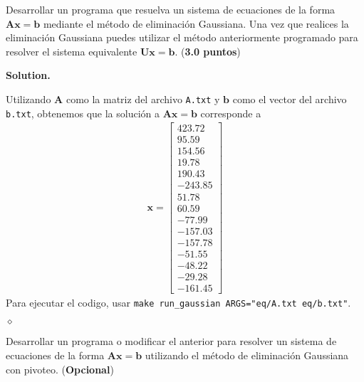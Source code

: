 \documentclass{article}
\theoremstyle{problemstyle}
\newenvironment{solution}{%
  \begin{mdframed}[linewidth=0.8pt,linecolor=Gray,backgroundcolor=Gray!5,roundcorner=5pt]%
  \noindent\textbf{Solution.}%
}{%
\hfill $ \diamond $ 
  \end{mdframed}%
}
\begin{document}
\begin{problem}
Desarrollar un programa que resuelva un sistema de ecuaciones de la forma $ \mathbf{Ax} = \mathbf{b} $ mediante el m\'etodo de eliminaci\'on Gaussiana. Una vez que realices la eliminaci\'on Gaussiana puedes utilizar el m\'etodo anteriormente programado para resolver el sistema equivalente $ \mathbf{Ux} = \mathbf{b} $. (\textbf{3.0 puntos})
\end{problem}
\begin{solution}
  Utilizando $ \mathbf{A} $ como la matriz del archivo \texttt{A.txt} y $ \mathbf{b} $ como el vector del archivo \texttt{b.txt}, obtenemos que la soluci\'on a $ \mathbf{Ax} = \mathbf{b} $ corresponde a
    \begin{align*}
      \mathbf{x} =\begin{bmatrix}
    423.72 \\
    95.59 \\
    154.56 \\
    19.78 \\
    190.43 \\
    -243.85 \\
    51.78 \\
    60.59 \\
    -77.99 \\
    -157.03 \\
    -157.78 \\
    -51.55 \\
    -48.22 \\
    -29.28 \\
    -161.45
\end{bmatrix} 
    \end{align*}
  Para ejecutar el codigo, usar \texttt{make run\_gaussian ARGS="eq/A.txt eq/b.txt"}.

\end{solution}

\begin{problem}
Desarrollar un programa o modificar el anterior para resolver un sistema de ecuaciones de la forma $ \mathbf{Ax} = \mathbf{b} $ utilizando el m\'etodo de eliminaci\'on Gaussiana con pivoteo. (\textbf{Opcional})
\end{problem}

\end{document}
